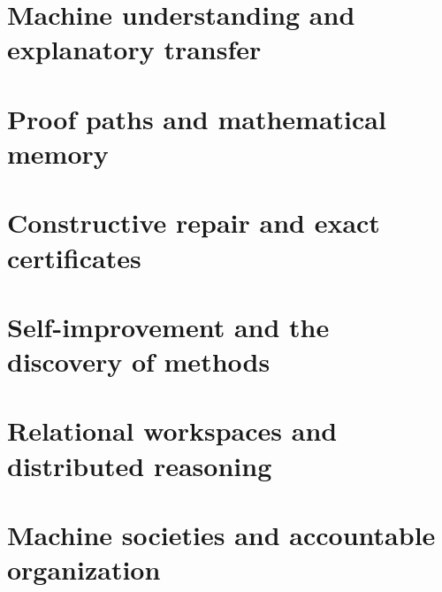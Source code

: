 \documentclass[11pt,oneside,openany]{book}
\numberwithin{equation}{section}
\begin{document}
\part{Machine understanding and explanatory transfer}
\setcounter{section}{0}

\part{Proof paths and mathematical memory}
\setcounter{section}{0}

\part{Constructive repair and exact certificates}
\setcounter{section}{0}

\part{Self-improvement and the discovery of methods}
\setcounter{section}{0}

\part{Relational workspaces and distributed reasoning}
\setcounter{section}{0}

\part{Machine societies and accountable organization}
\setcounter{section}{0}

\backmatter
\end{document}
